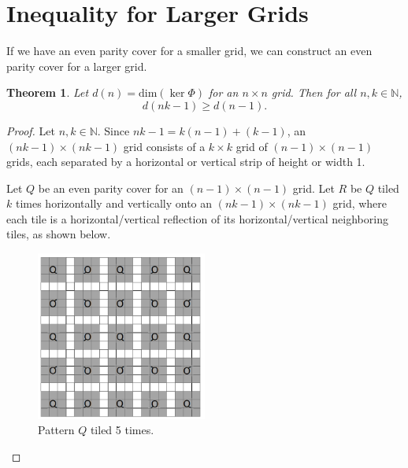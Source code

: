 \documentclass[a4paper]{article}
\newtheorem{theorem}{Theorem}
\newcommand{\N}{\mathbb{N}}
\renewcommand{\dim}[1]{\text{dim}\left( #1 \right)}
\begin{document}
	\section{Inequality for Larger Grids}
	If we have an even parity cover for a smaller grid, we can construct an even parity cover for a larger grid.
	
	\begin{theorem}\label{tiling-quiet-patterns}
		Let $d(n) = \dim{\ker{\Phi}}$ for an $n \times n$ grid.
		Then for all $n,k \in \N$,
		\begin{equation*}
			d(nk - 1) \geq d(n-1).
		\end{equation*}
	\end{theorem}
	\begin{proof}
		Let $n,k \in \N$.
		Since $nk - 1 = k(n-1) + (k-1)$, an $(nk-1) \times (nk-1)$ grid consists of a $k \times k$ grid of $(n-1) \times (n-1)$ grids, each separated by a horizontal or vertical strip of height or width 1.
	
		Let $Q$ be an even parity cover for an $(n-1) \times (n-1)$ grid.
		Let $R$ be $Q$ tiled $k$ times horizontally and vertically onto an $(nk-1) \times (nk-1)$ grid, where each tile is a horizontal/vertical reflection of its horizontal/vertical neighboring tiles, as shown below.
		
		\begin{figure}[H]
			\centering
%				
%				
%						
			\includegraphics[width=0.5\textwidth]{tiling_q.png}
			\caption{Pattern $Q$ tiled 5 times.}	
		\end{figure}
	

\end{proof}
\end{document}
